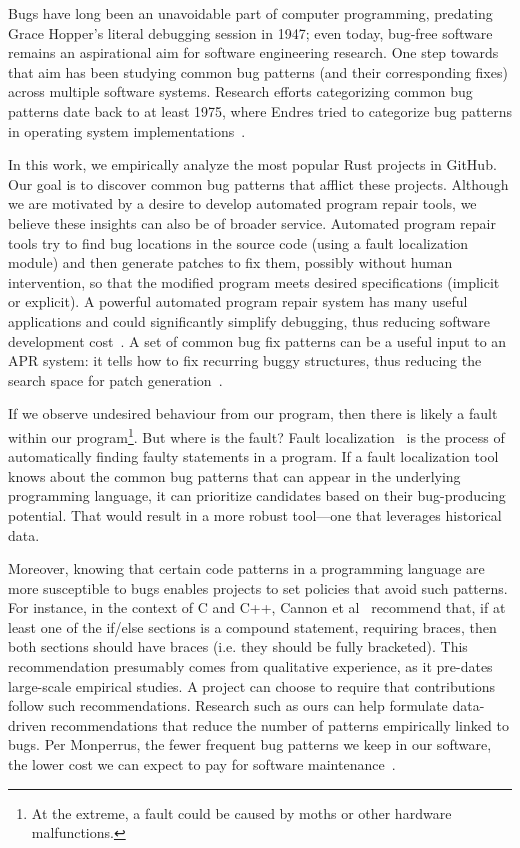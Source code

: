 Bugs have long been an unavoidable part of computer programming, predating Grace Hopper's literal debugging session in 1947; even today, bug-free software remains an aspirational aim for software engineering research. One step towards that aim has been studying common bug patterns (and their corresponding fixes) across multiple software systems. Research efforts categorizing common bug patterns date back to at least 1975, where Endres tried to categorize bug patterns in operating system implementations~\cite{endres1975analysis}.  

In this work, we empirically analyze the most popular Rust projects in GitHub. Our goal is to discover common bug patterns that afflict these projects. Although we are motivated by a desire to develop automated program repair tools, we believe these insights can also be of broader service. Automated program repair~\cite{goues2019automated,liu2018survey} tools try to find bug locations in the source code (using a fault localization module) and then generate patches to fix them, possibly without human intervention, so that the modified program meets desired specifications (implicit or explicit). A powerful automated program repair system has many useful applications and could significantly simplify debugging, thus reducing software development cost~\cite{le2012systematic}. A set of common bug fix patterns can be a useful input to an APR system: it tells how to fix recurring buggy structures, thus reducing the search space for patch generation~\cite{jeffrey2009bugfix}. 

If we observe undesired behaviour from our program, then there is likely a fault within our program\footnote{At the extreme, a fault could be caused by moths or other hardware malfunctions.}. But where is the fault? Fault localization~\cite{wong2016survey} is the process of automatically finding faulty statements in a program. If a fault localization tool knows about the common bug patterns that can appear in the underlying programming language, it can prioritize candidates based on their bug-producing potential. That would result in a more robust tool---one that leverages historical data.

Moreover, knowing that certain code patterns in a programming language are more susceptible to bugs enables projects to set policies that avoid such patterns. For instance, in the context of C and C++, Cannon et al~\cite{Cannon1997RecommendedCS} recommend that, if at least one of the if/else sections is a compound statement, requiring braces, then both sections should have braces (i.e. they should be fully bracketed). This recommendation presumably comes from qualitative experience, as it pre-dates large-scale empirical studies. A project can choose to require that contributions follow such recommendations. Research such as ours can help formulate data-driven recommendations that reduce the number of patterns empirically linked to bugs. Per Monperrus, the fewer frequent bug patterns we keep in our software, the lower cost we can expect to pay for software maintenance~\cite{monperrus2014critical}.

